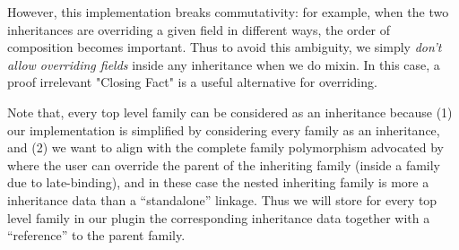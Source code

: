 However, this implementation breaks commutativity: for example, when the two inheritances are overriding a given field in different ways, the order of composition becomes important. Thus to avoid this ambiguity, we simply \textit{don't allow overriding fields} inside any inheritance when we do mixin. In this case, a proof irrelevant "Closing Fact" is a useful alternative for overriding.

Note that, every top level family can be considered as an inheritance because (1) our implementation is simplified by considering every family as an inheritance, and (2) we want to align with the complete family polymorphism advocated by \citet{zm2017} where the user can override the parent of the inheriting family (inside a family due to late-binding), and in these case the nested inheriting family is more a inheritance data than a ``standalone'' linkage. Thus we will store for every top level family in our plugin the corresponding inheritance data together with a ``reference'' to the parent family. 










